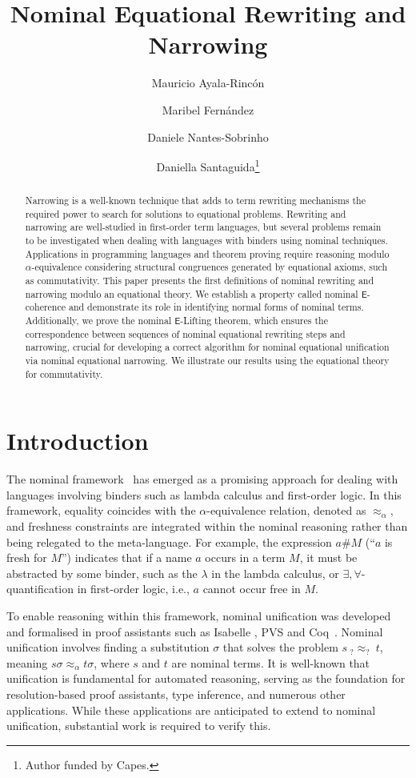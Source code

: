 \documentclass[submission,copyright,creativecommons]{eptcs}
\title{Nominal Equational Rewriting and Narrowing}
\author{
Mauricio Ayala-Rincón
\institute{University of Brasília, Brazil}
\and
Maribel Fernández
\institute{King's College London, UK}
\and
Daniele Nantes-Sobrinho
\institute{University of Brasília, Brazil}
\institute{Imperial College London, UK}
\and 
Daniella Santaguida\thanks{Author funded by Capes.}
\institute{University of Brasília, Brazil}
}
\newcommand{\aleq}{\approx_{\alpha}}
\newcommand{\theory}[1]{\ensuremath{\mathsf{#1}}}
\theoremstyle{plain}
\theoremstyle{definition}
\theoremstyle{remark}
\begin{document}
\maketitle

\begin{abstract}
Narrowing is a well-known technique that adds to term rewriting mechanisms the required power to search for solutions to equational problems. Rewriting and narrowing are well-studied in first-order term languages, but several problems remain to be investigated when dealing with languages with binders using nominal techniques. Applications in programming languages and theorem proving require reasoning modulo $\alpha$-equivalence considering structural congruences generated by equational axioms, such as commutativity. 
This paper presents the first definitions of nominal rewriting and narrowing modulo an equational theory. We establish a property called nominal \theory{E}-coherence and demonstrate its role in identifying normal forms of nominal terms. Additionally, we prove the nominal \theory{E}-Lifting theorem, which ensures the correspondence between sequences of nominal equational rewriting steps and narrowing, crucial for developing a correct algorithm for nominal equational unification via nominal equational narrowing. We illustrate our results using the equational theory for commutativity.
\end{abstract}

\section{Introduction}

The nominal framework~\cite{VarBinding/GabbayP02} has emerged as a promising approach for dealing with languages involving binders such as lambda calculus and first-order logic.  In this framework,
equality coincides with the $\alpha$-equivalence relation, denoted as $\aleq$, and freshness constraints are integrated within the nominal reasoning rather than being relegated to the meta-language. For example, the expression  $a\# M$  (``$a$ is fresh for $M$'') indicates that if a name $a$ occurs in a term $M$, it must be abstracted by some binder, such as the $\lambda$ in the lambda calculus, or $\exists,\forall$-quantification in first-order logic, i.e., $a$  cannot occur free in $M$. 



To enable reasoning within this framework, 
nominal  unification \cite{Matching/jcss/CalvesF10,NomUnification/UrbanPG04} was developed and  formalised in proof assistants such as Isabelle \cite{NomUnification/UrbanPG04}, PVS \cite{entcs:PVS/AnaCristina16} and Coq~\cite{A-C-AC/tcs/Ayala-RinconSFN19}. Nominal unification involves finding a substitution $\sigma$ that solves the problem $s\ _?{\overset{}{\approx}}_?\ t$, meaning $s\sigma\aleq t\sigma$, where $s$ and $t$ are nominal terms.  It is well-known that unification is fundamental for automated reasoning, serving as the foundation for resolution-based proof assistants, type inference, and numerous other applications. While these applications are anticipated to extend to nominal unification, substantial work is required to verify this. 
\end{document}

